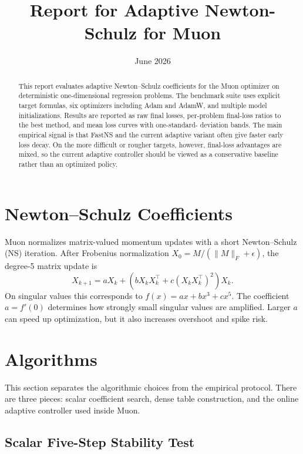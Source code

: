 \documentclass[11pt]{article}
\title{Report for Adaptive Newton-Schulz for Muon}
\date{June 2026}
\begin{document}
\maketitle

\begin{abstract}
This report evaluates adaptive Newton--Schulz coefficients for the Muon optimizer
on deterministic one-dimensional regression problems. The benchmark suite uses
explicit target formulas, six optimizers including Adam and AdamW, and multiple
model initializations. Results are reported as raw final losses, per-problem
final-loss ratios to the best method, and mean loss curves with one-standard-
deviation bands. The main empirical signal is that FastNS and the current
adaptive variant often give faster early loss decay. On the more difficult or
rougher targets, however, final-loss advantages are mixed, so the current
adaptive controller should be viewed as a conservative baseline rather than an
optimized policy.
\end{abstract}

\section{Newton--Schulz Coefficients}

Muon normalizes matrix-valued momentum updates with a short Newton--Schulz (NS)
iteration. After Frobenius normalization $X_0=M/(\|M\|_F+\epsilon)$, the degree-5
matrix update is
\begin{equation}
    X_{k+1} = aX_k + \left(bX_kX_k^\top + c(X_kX_k^\top)^2\right)X_k.
\end{equation}
On singular values this corresponds to $f(x)=ax+bx^3+cx^5$. The coefficient
$a=f'(0)$ determines how strongly small singular values are amplified. Larger
$a$ can speed up optimization, but it also increases overshoot and spike risk.

\section{Algorithms}

This section separates the algorithmic choices from the empirical protocol. There
are three pieces: scalar coefficient search, dense table construction, and the
online adaptive controller used inside Muon.

\subsection{Scalar Five-Step Stability Test}
\end{document}

